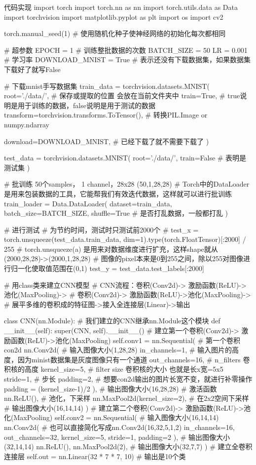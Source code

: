 \documentclass[openbib]{article}
\begin{document}
\begin{Python}{代码实现}
import torch
import torch.nn as nn
import torch.utils.data as Data
import torchvision
import matplotlib.pyplot as plt
import os
import cv2

torch.manual_seed(1)  # 使用随机化种子使神经网络的初始化每次都相同

# 超参数
EPOCH = 1  # 训练整批数据的次数
BATCH_SIZE = 50
LR = 0.001  # 学习率
DOWNLOAD_MNIST = True  # 表示还没有下载数据集，如果数据集下载好了就写False

# 下载mnist手写数据集
train_data = torchvision.datasets.MNIST(
root='./data/',  # 保存或提取的位置  会放在当前文件夹中
train=True,  # true说明是用于训练的数据，false说明是用于测试的数据
transform=torchvision.transforms.ToTensor(),  # 转换PIL.Image or numpy.ndarray

download=DOWNLOAD_MNIST,  # 已经下载了就不需要下载了
)

test_data = torchvision.datasets.MNIST(
root='./data/',
train=False  # 表明是测试集
)

# 批训练 50个samples， 1  channel，28x28 (50,1,28,28)
# Torch中的DataLoader是用来包装数据的工具，它能帮我们有效迭代数据，这样就可以进行批训练
train_loader = Data.DataLoader(
dataset=train_data,
batch_size=BATCH_SIZE,
shuffle=True  # 是否打乱数据，一般都打乱
)

# 进行测试
# 为节约时间，测试时只测试前2000个
#
test_x = torch.unsqueeze(test_data.train_data, dim=1).type(torch.FloatTensor)[:2000] / 255
# torch.unsqueeze(a) 是用来对数据维度进行扩充，这样shape就从(2000,28,28)->(2000,1,28,28)
# 图像的pixel本来是0到255之间，除以255对图像进行归一化使取值范围在(0,1)
test_y = test_data.test_labels[:2000]


# 用class类来建立CNN模型
# CNN流程：卷积(Conv2d)-> 激励函数(ReLU)->池化(MaxPooling)->
#        卷积(Conv2d)-> 激励函数(ReLU)->池化(MaxPooling)->
#        展平多维的卷积成的特征图->接入全连接层(Linear)->输出

class CNN(nn.Module):  # 我们建立的CNN继承nn.Module这个模块
def __init__(self):
super(CNN, self).__init__()
# 建立第一个卷积(Conv2d)-> 激励函数(ReLU)->池化(MaxPooling)
self.conv1 = nn.Sequential(
# 第一个卷积con2d
nn.Conv2d(  # 输入图像大小(1,28,28)
in_channels=1,  # 输入图片的高度，因为minist数据集是灰度图像只有一个通道
out_channels=16,  # n_filters 卷积核的高度
kernel_size=5,  # filter size 卷积核的大小 也就是长x宽=5x5
stride=1,  # 步长
padding=2,  # 想要con2d输出的图片长宽不变，就进行补零操作 padding = (kernel_size-1)/2
),  # 输出图像大小(16,28,28)
# 激活函数
nn.ReLU(),
# 池化，下采样
nn.MaxPool2d(kernel_size=2),  # 在2x2空间下采样
# 输出图像大小(16,14,14)
)
# 建立第二个卷积(Conv2d)-> 激励函数(ReLU)->池化(MaxPooling)
self.conv2 = nn.Sequential(
# 输入图像大小(16,14,14)
nn.Conv2d(  # 也可以直接简化写成nn.Conv2d(16,32,5,1,2)
in_channels=16,
out_channels=32,
kernel_size=5,
stride=1,
padding=2
),
# 输出图像大小 (32,14,14)
nn.ReLU(),
nn.MaxPool2d(2),
# 输出图像大小(32,7,7)
)
# 建立全卷积连接层
self.out = nn.Linear(32 * 7 * 7, 10)  # 输出是10个类


\end{Python}
\end{document}
